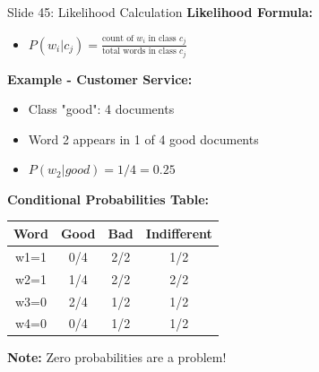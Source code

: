 \documentclass[8pt]{beamer}
\begin{document}
	\begin{frame}{Slide 45: Likelihood Calculation}
		\fontsize{6.5}{7.5}\selectfont
		\textbf{Likelihood Formula:}
		\begin{itemize}
			\item $P(w_i | c_j) = \frac{\text{count of } w_i \text{ in class } c_j}{\text{total words in class } c_j}$
		\end{itemize}
		
		\vspace{0.1cm}
		\textbf{Example - Customer Service:}
		\begin{itemize}
			\item Class "good": 4 documents
			\item Word 2 appears in 1 of 4 good documents
			\item $P(w_2 | good) = 1/4 = 0.25$
		\end{itemize}
		
		\vspace{0.1cm}
		\textbf{Conditional Probabilities Table:}
		\begin{tabular}{|c|c|c|c|}
			\hline
			Word & Good & Bad & Indifferent \\
			\hline
			w1=1 & 0/4 & 2/2 & 1/2 \\
			w2=1 & 1/4 & 2/2 & 2/2 \\
			w3=0 & 2/4 & 1/2 & 1/2 \\
			w4=0 & 0/4 & 1/2 & 1/2 \\
			\hline
		\end{tabular}
		
		\textcolor{myblue}{\textbf{Note:}} Zero probabilities are a problem!
	\end{frame}
	
\end{document}
